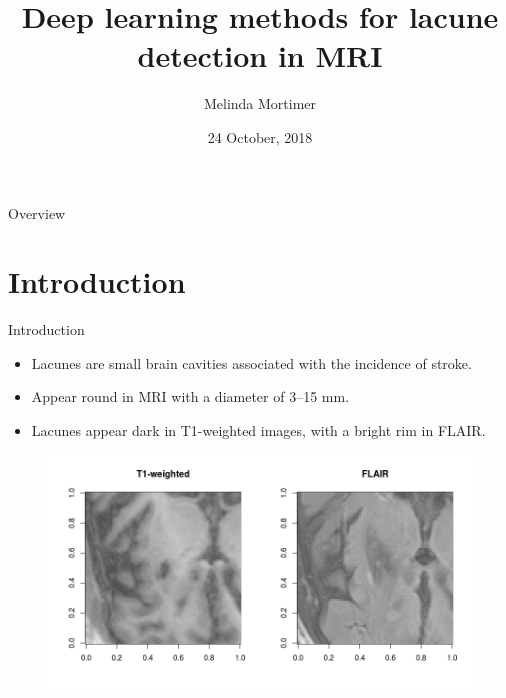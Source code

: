 \documentclass{beamer}
\title{Deep learning methods for lacune detection in MRI}
\author{Melinda Mortimer}
\institute[UNSW] %
{
  Supervisors: Dr Pierre Lafaye de Micheaux and A/Prof. Wei Wen
}
\date{24 October, 2018}
\begin{document}
\begin{frame}
	\titlepage
\end{frame}


\begin{frame}{Overview}
	\tableofcontents
\end{frame}

\section{Introduction}
\begin{frame}{Introduction}
    \begin{itemize}
    \item Lacunes are small brain cavities associated with the incidence of stroke.
    \item Appear round in MRI with a diameter of 3--15 mm.
	\item Lacunes appear dark in T1-weighted images, with a bright rim in FLAIR.
    \end{itemize}
    	\begin{figure}
	\centering
	\includegraphics[width=0.8\linewidth]{../Thesis_Docs/Images/2_lacune_t1_flair.png}
	\end{figure}
\end{frame}
\end{document}
